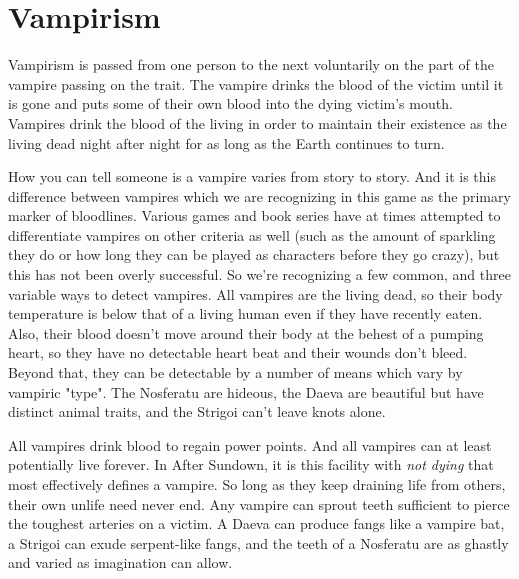\section{Vampirism} 

Vampirism is passed from one person to the next voluntarily on the part of the vampire passing on the trait. The vampire drinks the blood of the victim until it is gone and puts some of their own blood into the dying victim's mouth. Vampires drink the blood of the living in order to maintain their existence as the living dead night after night for as long as the Earth continues to turn.

How you can tell someone is a vampire varies from story to story. And it is this difference between vampires which we are recognizing in this game as the primary marker of bloodlines. Various games and book series have at times attempted to differentiate vampires on other criteria as well (such as the amount of sparkling they do or how long they can be played as characters before they go crazy), but this has not been overly successful. So we're recognizing a few common, and three variable ways to detect vampires. All vampires are the living dead, so their body temperature is below that of a living human even if they have recently eaten. Also, their blood doesn't move around their body at the behest of a pumping heart, so they have no detectable heart beat and their wounds don't bleed. Beyond that, they can be detectable by a number of means which vary by vampiric "type". The Nosferatu are hideous, the Daeva are beautiful but have distinct animal traits, and the Strigoi can't leave knots alone.

All vampires drink blood to regain power points. And all vampires can at least potentially live forever. In After Sundown, it is this facility with \textit{not dying} that most effectively defines a vampire. So long as they keep draining life from others, their own unlife need never end. Any vampire can sprout teeth sufficient to pierce the toughest arteries on a victim. A Daeva can produce fangs like a vampire bat, a Strigoi can exude serpent-like fangs, and the teeth of a Nosferatu are as ghastly and varied as imagination can allow.

